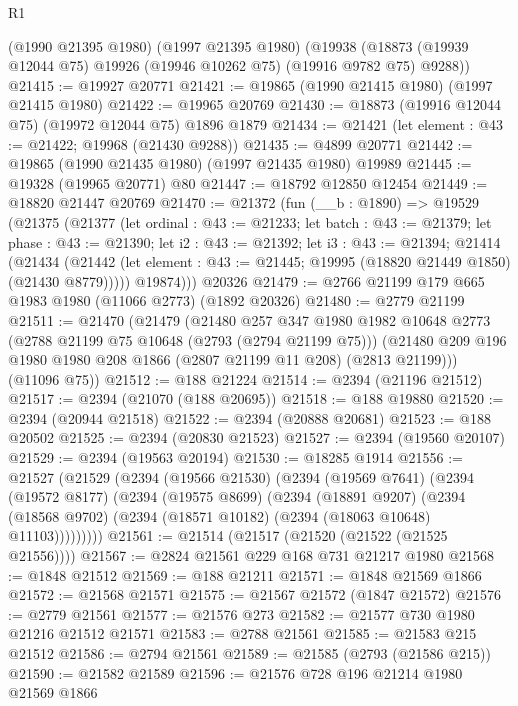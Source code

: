 \begin{lexlean}{R1}
\begin{coremodule}
    (@1990 @21395 @1980)
    (@1997 @21395 @1980)
    (@19938 (@18873 (@19939 @12044 @75) @19926 (@19946 @10262 @75) (@19916 @9782 @75) @9288))
@21415 := @19927 @20771
@21421 := @19865 (@1990 @21415 @1980) (@1997 @21415 @1980)
@21422 := @19965 @20769
@21430 := @18873 (@19916 @12044 @75) (@19972 @12044 @75) @1896 @1879
@21434 := @21421 (let element : @43 := @21422; @19968 (@21430 @9288))
@21435 := @4899 @20771
@21442 := @19865 (@1990 @21435 @1980) (@1997 @21435 @1980) @19989
@21445 := @19328 (@19965 @20771) @80
@21447 := @18792 @12850 @12454
@21449 := @18820 @21447 @20769
@21470 := @21372
    (fun (__b : @1890) =>
    @19529
      (@21375
        (@21377
          (let ordinal : @43 := @21233;
          let batch : @43 := @21379;
          let phase : @43 := @21390;
          let i2 : @43 := @21392;
          let i3 : @43 := @21394;
          @21414
            (@21434
              (@21442 (let element : @43 := @21445; @19995 (@18820 @21449 @1850) (@21430 @8779)))))
          @19874)))
    @20326
@21479 := @2766 @21199 @179 @665 @1983 @1980 (@11066 @2773) (@1892 @20326)
@21480 := @2779 @21199
@21511 := @21470
    (@21479
      (@21480
        @257
        @347
        @1980
        @1982
        @10648
        @2773
        (@2788 @21199 @75 @10648 (@2793 (@2794 @21199 @75)))
        (@21480 @209 @196 @1980 @1980 @208 @1866 (@2807 @21199 @11 @208) (@2813 @21199)))
      (@11096 @75))
@21512 := @188 @21224
@21514 := @2394 (@21196 @21512)
@21517 := @2394 (@21070 (@188 @20695))
@21518 := @188 @19880
@21520 := @2394 (@20944 @21518)
@21522 := @2394 (@20888 @20681)
@21523 := @188 @20502
@21525 := @2394 (@20830 @21523)
@21527 := @2394 (@19560 @20107)
@21529 := @2394 (@19563 @20194)
@21530 := @18285 @1914
@21556 := @21527
    (@21529
      (@2394
        (@19566 @21530)
        (@2394
          (@19569 @7641)
          (@2394
            (@19572 @8177)
            (@2394
              (@19575 @8699)
              (@2394
                (@18891 @9207)
                (@2394 (@18568 @9702) (@2394 (@18571 @10182) (@2394 (@18063 @10648) @11103)))))))))
@21561 := @21514 (@21517 (@21520 (@21522 (@21525 @21556))))
@21567 := @2824 @21561 @229 @168 @731 @21217 @1980
@21568 := @1848 @21512
@21569 := @188 @21211
@21571 := @1848 @21569 @1866
@21572 := @21568 @21571
@21575 := @21567 @21572 (@1847 @21572)
@21576 := @2779 @21561
@21577 := @21576 @273
@21582 := @21577 @730 @1980 @21216 @21512 @21571
@21583 := @2788 @21561
@21585 := @21583 @215 @21512
@21586 := @2794 @21561
@21589 := @21585 (@2793 (@21586 @215))
@21590 := @21582 @21589
@21596 := @21576 @728 @196 @21214 @1980 @21569 @1866

\end{coremodule}
\end{lexlean}
